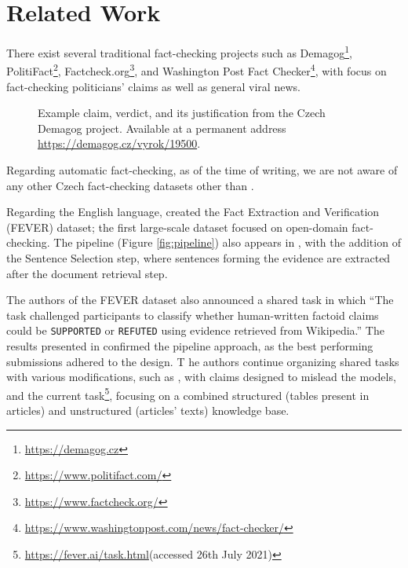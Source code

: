 \section{Related Work}

There exist several traditional fact-checking projects such as Demagog\footnote{\url{https://demagog.cz}}, PolitiFact\footnote{\url{https://www.politifact.com/}}, Factcheck.org\footnote{\url{https://www.factcheck.org/}}, and Washington Post Fact Checker\footnote{\url{https://www.washingtonpost.com/news/fact-checker/}}, with focus on fact-checking politicians' claims as well as general viral news. 

\begin{figure}[h!]
    \caption[Czech Demagog Entry Example]{Example claim, verdict, and its justification from the Czech Demagog project. Available at a permanent address \url{https://demagog.cz/vyrok/19500}.}
\end{figure}

Regarding automatic fact-checking, as of the time of writing, we are not aware of any other Czech fact-checking datasets other than \citep{czech-fact}.

Regarding the English language, \citet{fever} created the Fact Extraction and Verification (FEVER) dataset; the first large-scale dataset focused on open-domain fact-checking.
The pipeline (Figure \ref{fig:pipeline}) also appears in \citep{fever}, with the addition of the Sentence Selection step, where sentences forming the evidence are extracted after the document retrieval step.

The authors of the FEVER dataset also announced a shared task \citep{fever-2018-shared-task} in which ``The task challenged participants to classify whether human-written factoid claims could be \texttt{SUPPORTED} or \texttt{REFUTED} using evidence retrieved from Wikipedia.'' The results presented in \citep{fever-2018-shared-task} confirmed the pipeline approach, as the best performing submissions adhered to the design. T he authors continue organizing shared tasks with various modifications, such as \citep{fever-2019-shared-task-adversial}, with claims designed to mislead the models, and the current task\footnote{\url{https://fever.ai/task.html}(accessed 26th July 2021)}, focusing on a combined structured (tables present in articles) and unstructured (articles' texts) knowledge base.



